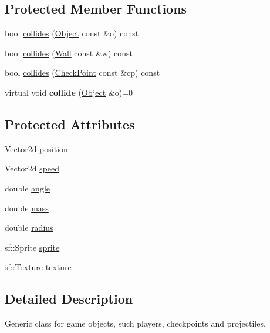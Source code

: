 \subsection*{Protected Member Functions}
\begin{DoxyCompactItemize}
\item 
bool \hyperlink{classObject_a4651b3e887145345efc01e98bb9e7b15}{collides} (\hyperlink{classObject}{Object} const \&o) const
\item 
bool \hyperlink{classObject_a9f3dd05fa465ed26bcb89a92dd25190c}{collides} (\hyperlink{classWall}{Wall} const \&w) const
\item 
bool \hyperlink{classObject_a6e41ad759709da8f973419a57c5e7a1c}{collides} (\hyperlink{classCheckPoint}{Check\+Point} const \&cp) const
\item 
\hypertarget{classObject_a026ddef458c358eef33f631c4db42172}{}\label{classObject_a026ddef458c358eef33f631c4db42172} 
virtual void {\bfseries collide} (\hyperlink{classObject}{Object} \&o)=0
\end{DoxyCompactItemize}
\subsection*{Protected Attributes}
\begin{DoxyCompactItemize}
\item 
Vector2d \hyperlink{classObject_ab77f145878370ab7b92f067432dc375c}{position}
\item 
Vector2d \hyperlink{classObject_a740762c9fe723eda94fe82862a8fa200}{speed}
\item 
double \hyperlink{classObject_aa08efab6c2c6898b1d0d7103076d8674}{angle}
\item 
double \hyperlink{classObject_abbd565f533683168a39d703f3b5c6bae}{mass}
\item 
double \hyperlink{classObject_aacfbf5151daad699c60efc27fb702406}{radius}
\item 
sf\+::\+Sprite \hyperlink{classObject_a65be09abc56e93e0154c3a0e37f97579}{sprite}
\item 
sf\+::\+Texture \hyperlink{classObject_a8abc6192982ee39b2dc9d9b05cc155ee}{texture}
\end{DoxyCompactItemize}


\subsection{Detailed Description}
Generic class for game objects, such players, checkpoints and projectiles. 

